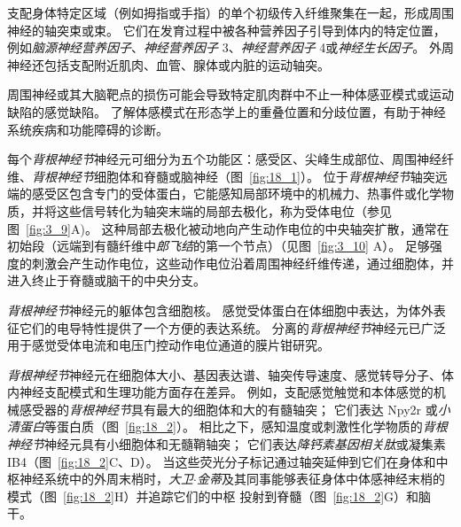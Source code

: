支配身体特定区域（例如拇指或手指）的单个初级传入纤维聚集在一起，形成周围神经的轴突束或束。
它们在发育过程中被各种营养因子引导到体内的特定位置，例如\textit{脑源神经营养因子}、\textit{神经营养因子} 3、\textit{神经营养因子} 4或\textit{神经生长因子}。
外周神经还包括支配附近肌肉、血管、腺体或内脏的运动轴突。


周围神经或其大脑靶点的损伤可能会导致特定肌肉群中不止一种体感亚模式或运动缺陷的感觉缺陷。
了解体感模式在形态学上的重叠位置和分歧位置，有助于神经系统疾病和功能障碍的诊断。


每个\textit{背根神经节}神经元可细分为五个功能区：感受区、尖峰生成部位、周围神经纤维、\textit{背根神经节}细胞体和脊髓或脑神经（图~\ref{fig:18_1}）。
位于\textit{背根神经节}轴突远端的感受区包含专门的受体蛋白，它能感知局部环境中的机械力、热事件或化学物质，并将这些信号转化为轴突末端的局部去极化，称为受体电位（参见图~\ref{fig:3_9}A)。
这种局部去极化被动地向产生动作电位的中央轴突扩散，通常在初始段（远端到有髓纤维中\textit{郎飞结}的第一个节点）（见图~\ref{fig:3_10} A）。
足够强度的刺激会产生动作电位，这些动作电位沿着周围神经纤维传递，通过细胞体，并进入终止于脊髓或脑干的中央分支。


\textit{背根神经节}神经元的躯体包含细胞核。 
感觉受体蛋白在体细胞中表达，为体外表征它们的电导特性提供了一个方便的表达系统。 
分离的\textit{背根神经节}神经元已广泛用于感觉受体电流和电压门控动作电位通道的膜片钳研究。


\textit{背根神经节}神经元在细胞体大小、基因表达谱、轴突传导速度、感觉转导分子、体内神经支配模式和生理功能方面存在差异。 
例如，支配感觉触觉和本体感觉的机械感受器的\textit{背根神经节}具有最大的细胞体和大的有髓轴突； 它们表达 Npy2r 或\textit{小清蛋白}等蛋白质（图~\ref{fig:18_2}）。
相比之下，感知温度或刺激性化学物质的\textit{背根神经节}神经元具有小细胞体和无髓鞘轴突； 它们表达\textit{降钙素基因相关肽}或凝集素 IB4（图~\ref{fig:18_2}C、D）。 
当这些荧光分子标记通过轴突延伸到它们在身体和中枢神经系统中的外周末梢时，\textit{大卫$\cdot$金蒂}及其同事能够表征身体中体感神经末梢的模式（图~\ref{fig:18_2}H）并追踪它们的中枢 投射到脊髓（图~\ref{fig:18_2}G）和脑干。

